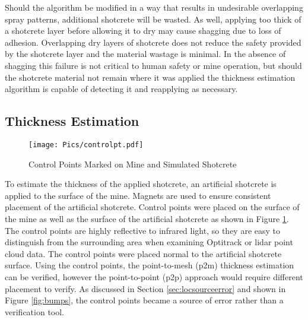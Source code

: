 Should the algorithm be modified in a way that results in undesirable overlapping spray patterns, additional shotcrete will be wasted. As well, applying too thick of a shotcrete layer before allowing it to dry may cause shagging due to loss of adhesion. Overlapping dry layers of shotcrete does not reduce the safety provided by the shotcrete layer and the material wastage is minimal. In the absence of shagging this failure is not critical to human safety or mine operation, but should the shotcrete material not remain where it was applied the thickness estimation algorithm is capable of detecting it and reapplying as necessary.\\

\subsection{Thickness Estimation}

\begin{figure}[h]
    \centering
    \texttt{[image: Pics/controlpt.pdf]}
    \caption{Control Points Marked on Mine and Simulated Shotcrete}
    \label{fig:controlpts}
\end{figure}

To estimate the thickness of the applied shotcrete, an artificial shotcrete is applied to the surface of the mine. Magnets are used to ensure consistent placement of the artificial shotcrete. Control points were placed on the surface of the mine as well as the surface of the artificial shotcrete as shown in Figure \ref{fig:controlpts}. The control points are highly reflective to infrared light, so they are easy to distinguish from the surrounding area when examining Optitrack or \acrshort{lidar} point cloud data. The control points were placed normal to the artificial shotcrete surface. Using the control points, the point-to-mesh (\acrshort{p2m}) thickness estimation can be verified, however the point-to-point (\acrshort{p2p}) approach would require different placement to verify. As discussed in Section \ref{sec:locsourceerror} and shown in Figure \ref{fig:bumps}, the control points became a source of error rather than a verification tool.\\

